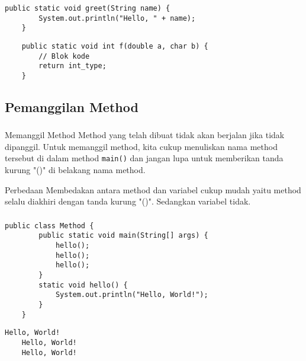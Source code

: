 \documentclass[aspectratio=169]{beamer}
\theoremstyle{definition}
\begin{document}
    \begin{frame}[fragile]
        \frametitle{\insertsection}
        \framesubtitle{\insertsubsection}
        \begin{lstlisting}[caption={Contoh Method berparameter}]
    public static void greet(String name) {
        System.out.println("Hello, " + name);
    }
        \end{lstlisting}
        \begin{lstlisting}
    public static void int f(double a, char b) {
        // Blok kode
        return int_type;
    }
        \end{lstlisting}
    \end{frame}

    \subsection{Pemanggilan Method}
    \begin{frame}
        \frametitle{\insertsection}
        \framesubtitle{\insertsubsection}
        \begin{block}{Memanggil Method}
            Method yang telah dibuat tidak akan berjalan jika tidak dipanggil. Untuk memanggil method, kita cukup menuliskan nama method tersebut di dalam method \texttt{main()} dan jangan lupa untuk memberikan tanda kurung "()" di belakang nama method.
        \end{block}
        \begin{exampleblock}{Perbedaan}
            Membedakan antara method dan variabel cukup mudah yaitu method selalu diakhiri dengan tanda kurung "()". Sedangkan variabel tidak.
        \end{exampleblock}
    \end{frame}


    \begin{frame}[fragile]
        \frametitle{\insertsection}
        \framesubtitle{\insertsubsection}
        \begin{lstlisting}[caption={Pemanggilan Method}]
    public class Method {
        public static void main(String[] args) {
            hello();
            hello();
            hello();
        }
        static void hello() {
            System.out.println("Hello, World!");
        }
    }
        \end{lstlisting}
        \begin{lstlisting}[style=output]
    Hello, World!
    Hello, World!
    Hello, World!
        \end{lstlisting}
    \end{frame}
\end{document}

